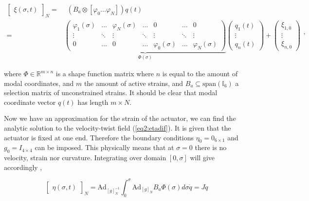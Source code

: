 \begin{equation}
\begin{aligned}
    \begin{bmatrix}\xi(\sigma,t)\end{bmatrix}_N = & \hspace{5pt}  (B_a \otimes [ \varphi_0 \dots \varphi_N ])q(t)\\ = &  \underbrace{ \begin{pmatrix}
    \varphi_1(\sigma) & \dots  & \varphi_N(\sigma) & \dots     & 0      & \dots  &  0 \\
    \vdots    & \ddots & \vdots    & \ddots    & \vdots & \ddots & \vdots \\
    0         & \dots  & 0         & \dots     & \varphi_0(\sigma) & \dots & \varphi_N (\sigma)
    \end{pmatrix}}_{\Phi(\sigma)} \begin{pmatrix} q_1(t) \\ \vdots \\ q_n(t) \end{pmatrix} +  \begin{pmatrix} \xi_{1,0} \\ \vdots \\ \xi_{n,0}   \end{pmatrix}
    \end{aligned},
\label{eq2:xishape}
\end{equation}

where $\Phi \in \mathbb{R}^{m \times n}$ is a shape function matrix where $n$ is equal to the amount of modal coordinates, and $m$ the amount of active strains, and $B_a \subseteq \text{span}(\mathbb{I}_6)$ a selection matrix of unconstrained strains. It should be clear that modal coordinate vector $q(t)$ has length $m \times N$.

Now we have an approximation for the strain of the actuator, we can find the analytic solution to the  velocity-twist field (\ref{eq2:etadif}). It is given that the actuator is fixed at one end. Therefore the boundary conditions $\eta_0 = 0_{6 \times 1}$ and $g_0 = I_{4\times 4}$ can be imposed. This physically means that at $\sigma = 0$ there is no velocity, strain nor curvature.  Integrating over domain $[0,\sigma]$ will give accordingly \cite{Caasenbrood2020},

\begin{equation}
  \begin{bmatrix} \eta(\sigma,t)\end{bmatrix}_N = \text{Ad}_{[g]_N^{-1}} \int_0^{\sigma} \text{Ad}_{[g]_N} B_a \Phi(\sigma) d \sigma \dot{q} = J\dot{q}
    \label{eq2:J}
\end{equation}

